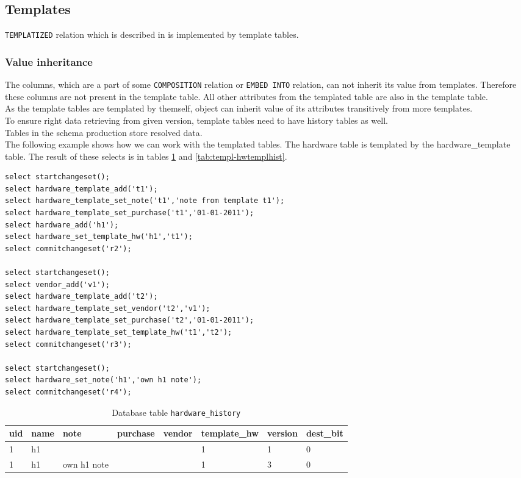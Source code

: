 \documentclass[deska]{subfiles}
\begin{document}
\subsection{Templates}
{\tt TEMPLATIZED} relation which is described in  is implemented by template tables. 

\subsubsection{Value inheritance}
The columns, which are a part of some {\tt COMPOSITION} relation or {\tt EMBED INTO} relation, can not inherit its value from templates. Therefore these columns are not present in the template table. All other attributes from the templated table are also in the template table.\\
As the template tables are templated by themself, object can inherit value of its attributes transitively from more templates.\\
To ensure right data retrieving from given version, template tables need to have history tables as well.\\
Tables in the schema production store resolved data.\\
The following example shows how we can work with the templated tables. The hardware table is templated by the hardware\_template table. The result of these selects is in tables \ref{tab:templ-hwhist} and \ref{tab:templ-hwtemplhist}.

\begin{verbatim}
select startchangeset();
select hardware_template_add('t1');
select hardware_template_set_note('t1','note from template t1');
select hardware_template_set_purchase('t1','01-01-2011');
select hardware_add('h1');
select hardware_set_template_hw('h1','t1');
select commitchangeset('r2');

select startchangeset();
select vendor_add('v1');
select hardware_template_add('t2');
select hardware_template_set_vendor('t2','v1');
select hardware_template_set_purchase('t2','01-01-2011');
select hardware_template_set_template_hw('t1','t2');
select commitchangeset('r3');

select startchangeset();
select hardware_set_note('h1','own h1 note');
select commitchangeset('r4');
\end{verbatim}

\begin{longtable}{ l | l | l | l | l | l | l | l }
    \caption{Database table {\tt hardware\_history}}\\
    uid & name & note & purchase & vendor & template\_hw & version & dest\_bit\\
    \hline
    \endhead
\label{tab:templ-hwhist}
    1 & h1 &  &  &  & 1 & 1 & 0\\
    1 & h1 & own h1 note &  &  & 1 & 3 & 0\\
    \hline
\end{longtable}
\end{document}
